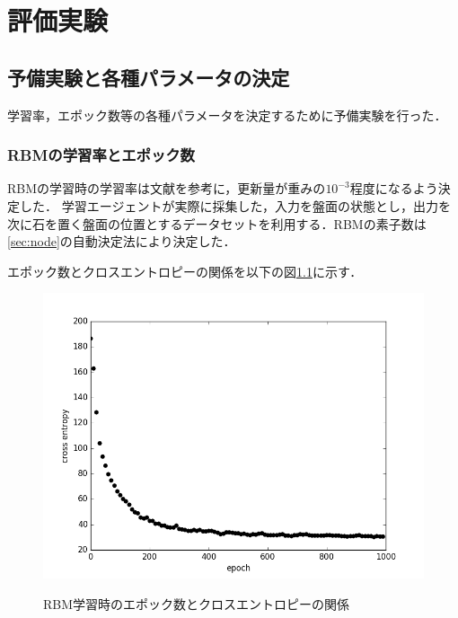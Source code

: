 
\chapter{評価実験}

\section{予備実験と各種パラメータの決定}\label{sec:lr}

学習率，エポック数等の各種パラメータを決定するために予備実験を行った．

\subsection{RBMの学習率とエポック数}
RBMの学習時の学習率は文献\cite{Hinton-guide}を参考に，更新量が重みの$10^{-3}$程度になるよう決定した．
学習エージェントが実際に採集した，入力を盤面の状態とし，出力を次に石を置く盤面の位置とするデータセットを利用する．RBMの素子数は\ref{sec:node}の自動決定法により決定した．


エポック数とクロスエントロピーの関係を以下の図\ref{fig:ep}に示す．

\begin{figure}[]
\begin{center}
   \includegraphics[scale=0.8]{./koki/l.png} \\
   \caption{RBM学習時のエポック数とクロスエントロピーの関係}
\label{fig:ep}
\end{center}
\end{figure}

